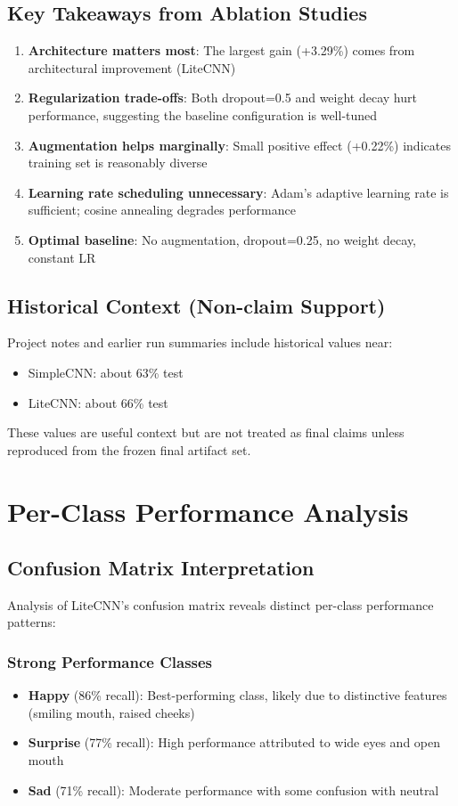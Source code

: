\documentclass[12pt,a4paper]{article}
\begin{document}
\subsection{Key Takeaways from Ablation Studies}
\begin{enumerate}
    \item \textbf{Architecture matters most}: The largest gain (+3.29\%) comes from architectural improvement (LiteCNN)
    \item \textbf{Regularization trade-offs}: Both dropout=0.5 and weight decay hurt performance, suggesting the baseline configuration is well-tuned
    \item \textbf{Augmentation helps marginally}: Small positive effect (+0.22\%) indicates training set is reasonably diverse
    \item \textbf{Learning rate scheduling unnecessary}: Adam's adaptive learning rate is sufficient; cosine annealing degrades performance
    \item \textbf{Optimal baseline}: No augmentation, dropout=0.25, no weight decay, constant LR
\end{enumerate}

\subsection{Historical Context (Non-claim Support)}
Project notes and earlier run summaries include historical values near:
\begin{itemize}[leftmargin=*]
    \item SimpleCNN: about 63\% test
    \item LiteCNN: about 66\% test
\end{itemize}
These values are useful context but are not treated as final claims unless reproduced from the frozen final artifact set.

\section{Per-Class Performance Analysis}

\subsection{Confusion Matrix Interpretation}
Analysis of LiteCNN's confusion matrix reveals distinct per-class performance patterns:

\subsubsection{Strong Performance Classes}
\begin{itemize}[leftmargin=*]
    \item \textbf{Happy} (86\% recall): Best-performing class, likely due to distinctive features (smiling mouth, raised cheeks)
    \item \textbf{Surprise} (77\% recall): High performance attributed to wide eyes and open mouth  
    \item \textbf{Sad} (71\% recall): Moderate performance with some confusion with neutral
\end{itemize}
\end{document}
